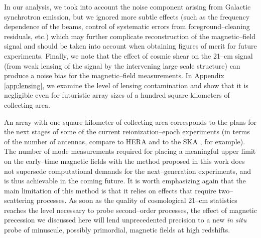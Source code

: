 In our analysis, we took into account the noise component arising from Galactic synchrotron emission, but we ignored more subtle effects (such as the frequency dependence of the beams, control of systematic errors from foreground--cleaning residuals, etc.) which may further complicate reconstruction of the magnetic--field signal and should be taken into account when obtaining figures of merit for future experiments.
Finally, we note that the effect of cosmic shear on the 21--cm signal (from weak lensing of the signal by the intervening large scale structure) can produce a noise bias for the magnetic--field measurements. In Appendix \ref{app:lensing}, we examine the level of lensing contamination and show that it is negligible even for futuristic array sizes of a hundred square kilometers of collecting area. 

An array with one square kilometer of collecting area corresponds to the plans for the next stages of some of the current reionization--epoch experiments (in terms of the number of antennas, compare to HERA and to the SKA \cite{2008arXiv0802.1727C}, for example). The number of mode measurements required for placing a meaningful upper limit on the early--time magnetic fields with the method proposed in this work does not supersede computational demands for the next--generation  experiments, and is thus achievable in the coming future. It is worth emphasizing again that the main limitation of this method is that it relies on effects that require two--scattering processes. As soon as the quality of cosmological 21--cm statistics reaches the level necessary to probe second--order processes, the effect of magnetic precession we discussed here will lend unprecedented precision to a new \textit{in situ} probe of minuscule, possibly primordial, magnetic fields at high redshifts. 

  